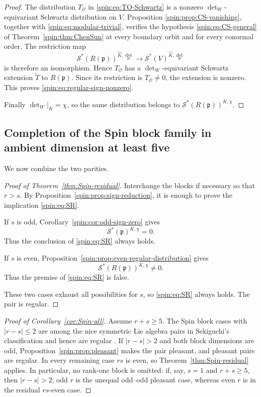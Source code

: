 \documentclass[11pt,reqno]{amsart}
\numberwithin{equation}{section}
\theoremstyle{definition}
\theoremstyle{remark}
\newcommand{\fp}{\mathfrak p}
\newcommand{\cO}{\mathcal O}
\newcommand{\cS}{\mathcal S}
\begin{document}
\begin{proof}
The distribution $T_{\cO}$ in \eqref{spin:eq:TO-Schwartz} is a nonzero
$\det_W$-equivariant Schwartz distribution on $V$.  Proposition
\ref{spin:prop:CS-vanishing}, together with
\eqref{spin:eq:modular-trivial}, verifies the hypothesis
\eqref{spin:eq:CS-general} of Theorem~\ref{spin:thm:ChenSun} at every boundary orbit and
for every conormal order.  The restriction map
\[
  \cS^*(R(\fp))^{\widehat K,\det_W}
  \longrightarrow
  \cS^*(V)^{\widehat K,\det_W}
\]
is therefore an isomorphism.  Hence $T_{\cO}$ has a
$\det_W$-equivariant Schwartz extension $\widetilde T$ to $R(\fp)$.  Since
its restriction is $T_{\cO}\ne0$, the extension is nonzero.  This proves
\eqref{spin:eq:regular-sign-nonzero}.

Finally $\det_W|_K=\chi$, so the same distribution belongs to
$\cS^*(R(\fp))^{K,\chi}$.
\end{proof}

\subsection{Completion of the Spin block family in ambient dimension at least five}\label{spin:sec:conclusion}

We now combine the two parities.

\begin{proof}[Proof of Theorem~\ref{thm:Spin-residual}]
Interchange the blocks if necessary so that $r>s$.  By
Proposition~\ref{spin:prop:sign-reduction}, it is enough to prove the implication
\eqref{spin:eq:SR}.

If $s$ is odd, Corollary~\ref{spin:cor:odd-sign-zero} gives
\[
  \cS^*(\fp)^{K,\chi}=0.
\]
Thus the conclusion of \eqref{spin:eq:SR} always holds.

If $s$ is even, Proposition~\ref{spin:prop:even-regular-distribution} gives
\[
  \cS^*(R(\fp))^{K,\chi}\ne0.
\]
Thus the premise of \eqref{spin:eq:SR} is false.

These two cases exhaust all possibilities for $s$, so \eqref{spin:eq:SR} always
holds.  The pair is regular.
\end{proof}

\begin{proof}[Proof of Corollary~\ref{cor:Spin-all}]
Assume $r+s\ge5$.  The Spin block cases with $|r-s|\le2$ are among the
nice symmetric Lie algebra pairs in Sekiguchi's classification and hence are
regular \cite[Lemmas~4.21--4.22 and Table~3]{Rubio}.  If $|r-s|>2$ and both
block dimensions are odd, Proposition~\ref{spin:prop:pleasant} makes the pair
pleasant, and pleasant pairs are regular.  In every remaining case $rs$ is
even, so Theorem~\ref{thm:Spin-residual} applies.  In particular, no
rank-one block is omitted: if, say, $s=1$ and $r+s\ge5$, then
$|r-s|>2$; odd $r$ is the unequal odd--odd pleasant case, whereas even $r$ is
in the residual $rs$-even case.
\end{proof}
\end{document}

